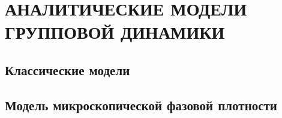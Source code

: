 \chapter{АНАЛИТИЧЕСКИЕ МОДЕЛИ ГРУППОВОЙ ДИНАМИКИ}
\label{ch:TheoreticalModels}
\section{Классические модели} %
\label{sec:ClassicalModelsWIthViscosity}


\section{Модель микроскопической фазовой плотности} %
\label{sec:KulinskyModel}

